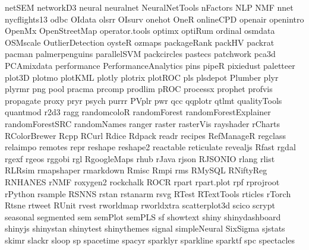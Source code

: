 \documentclass[10pt]{article} %
\begin{document}
\begin{itemize}
      netSEM
      networkD3
      neural
      neuralnet
      NeuralNetTools
      nFactors
      NLP
      NMF
      nnet
      nycflights13
      odbc
      OIdata
      olsrr
      OIsurv
      onehot
      OneR
      onlineCPD
      openair
      openintro
      OpenMx
      OpenStreetMap
      operator.tools
      optimx
      optiRum
      ordinal
      osmdata
      OSMscale
      OutlierDetection
      oysteR
      ozmaps
      packageRank
      packHV
      packrat
      pacman
      palmerpenguins
      parallelSVM
      packcircles
      pastecs
      patchwork
      pca3d
      PCAmixdata
      performance
      PerformanceAnalytics
      pins
      pipeR
      pixiedust
      paletteer
      plot3D
      plotmo
      plotKML
      plotly
      plotrix
      plotROC
      pls
      plsdepot
      Plumber
      plyr
      plyrmr
      png
      pool
      pracma
      prcomp
      prodlim
      pROC
      processx
      prophet
      profvis
      propagate
      proxy
      pryr
      psych
      purrr
      PVplr
      pwr
      qcc
      qqplotr
      qtlmt
      qualityTools
      quantmod
      r2d3
      ragg
      randomcoloR
      randomForest
      randomForestExplainer
      randomForestSRC
      randomNames
      ranger
      raster
      rasterVis
      rayshader
      rCharts
      RColorBrewer
      Rcpp
      RCurl
      Rdice
      Rdpack
      readr
      recipes
      RefManageR
      regclass
      relaimpo
      remotes
      repr
      reshape
      reshape2
      reactable
      reticulate
      revealjs
      Rfast
      rgdal
      rgexf
      rgeos
      rggobi
      rgl
      RgoogleMaps
      rhub
      rJava
      rjson
      RJSONIO
      rlang
      rlist
      RLRsim
      rmapshaper
      rmarkdown
      Rmisc
      Rmpi
      rms
      RMySQL
      RNiftyReg
      RNHANES
      rNMF
      roxygen2
      rockchalk
      ROCR
      rpart
      rpart.plot
      rpf
      rprojroot
      rPython
      rsample
      RSNNS
      rstan
      rstanarm
      rsvg
      RTest
      RTextTools
      rticles
      rTorch
      Rtsne
      rtweet
      RUnit
      rvest
      rworldmap
      rworldxtra
      scatterplot3d
      scico
      scrypt
      seasonal
      segmented
      sem
      semPlot
      semPLS
      sf
      showtext
      shiny
      shinydashboard
      shinyjs
      shinystan
      shinytest
      shinythemes
      signal
      simpleNeural
      SixSigma
      sjstats
      skimr
      slackr
      sloop
      sp
      spacetime
      spacyr
      sparklyr
      sparkline
      sparktf
      spc
      spectacles

\end{itemize}
\end{document}
